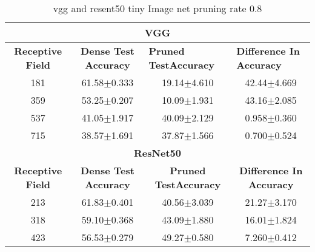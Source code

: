 \begin{table}[H]
\begin{tabular}{@{}cccc@{}}
\toprule
\multicolumn{4}{c}{\textbf{VGG}}                                                                                                                                  \\ \midrule
\textbf{Receptive Field} & \textbf{Dense Test Accuracy} & \multicolumn{1}{l}{\textbf{Pruned  TestAccuracy}} & \multicolumn{1}{l}{\textbf{Difference In Accuracy}} \\ \midrule
181                      & 61.58$\pm$0.333              & 19.14$\pm$4.610                                   & 42.44$\pm$4.669                                     \\
359                      & 53.25$\pm$0.207              & 10.09$\pm$1.931                                   & 43.16$\pm$2.085                                     \\
537                      & 41.05$\pm$1.917              & 40.09$\pm$2.129                                   & 0.958$\pm$0.360                                     \\
715                      & 38.57$\pm$1.691              & 37.87$\pm$1.566                                   & 0.700$\pm$0.524                                     \\ \midrule
\multicolumn{4}{c}{\textbf{ResNet50}}                                                                                                                             \\ \midrule
\textbf{Receptive Field} & \textbf{Dense Test Accuracy} & \textbf{Pruned  TestAccuracy}                     & \textbf{Difference In Accuracy}                     \\
213                      & 61.83$\pm$0.401              & 40.56$\pm$3.039                                   & 21.27$\pm$3.170                                     \\
318                      & 59.10$\pm$0.368              & 43.09$\pm$1.880                                   & 16.01$\pm$1.824                                     \\
423                      & 56.53$\pm$0.279              & 49.27$\pm$0.580                                   & 7.260$\pm$0.412                                     \\ \bottomrule
\end{tabular}
\caption{vgg and resent50 tiny Image net pruning rate 0.8}
\label{tab:tiny imagenet pruning rate08}
\end{table}


